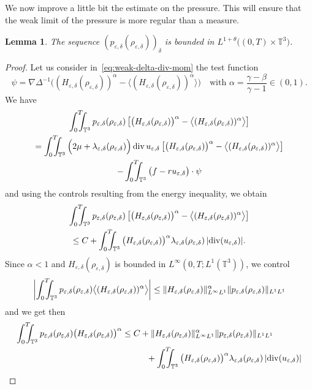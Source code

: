 \documentclass[10pt]{amsart}
\newcommand{\<}{\bigl\langle}
\renewcommand{\>}{\bigr\rangle}
\newcommand{\intTTT}{\int_0^T\hspace*{-2.5mm}\int_{\TT}}
\newtheorem{lem}[thm]{Lemma}
\theoremstyle{definition}
\theoremstyle{remark}
\newcommand{\TT}{\mathbb{T}^3}
\DeclareMathOperator{\Div}{div}
\let\ep\varepsilon
\begin{document}
We now improve a little bit the estimate on the pressure.
This will ensure that the weak limit of the pressure is more regular than a measure.
\begin{lem}{\label{lem:estim-pressure}}
The sequence $(p_{\ep,\delta}(\rho_{\ep,\delta}))_\delta$ is bounded in $L^{1+\theta}\big((0,T)\times \TT \big)$.
\end{lem}
\begin{proof}
Let us consider in~\eqref{eq:weak-delta-div-mom} the test function
\[
\psi = \nabla \Delta^{-1}\big((H_{\ep,\delta}(\rho_{\ep,\delta}))^\alpha - \<(H_{\ep,\delta}(\rho_{\ep,\delta}))^\alpha\> \big) \quad \text{with } \alpha = \dfrac{\gamma - \beta}{\gamma-1} \in (0,1).
\]
We have
\begin{multline*}
\intTTT{p_{\ep,\delta}(\rho_{\ep,\delta}) \left[\big(H_{\ep,\delta}(\rho_{\ep,\delta}) \big)^{\alpha} - \<(H_{\ep,\delta}(\rho_{\ep,\delta}))^\alpha\> \right] } \\
= \intTTT{\Big(2\mu + \lambda_{\ep,\delta}(\rho_{\ep,\delta})\Big)\Div u_{\ep,\delta} \left[\big(H_{\ep,\delta}(\rho_{\ep,\delta}) \big)^{\alpha} - \<(H_{\ep,\delta}(\rho_{\ep,\delta}))^\alpha\> \right]} \\
- \intTTT{\big(f-ru_{\ep,\delta}\big) \cdot \psi }
\end{multline*}
and using the controls resulting from the energy inequality, we obtain
\begin{multline*}
\intTTT{p_{\ep,\delta}(\rho_{\ep,\delta}) \left[\big(H_{\ep,\delta}(\rho_{\ep,\delta}) \big)^{\alpha} - \<(H_{\ep,\delta}(\rho_{\ep,\delta}))^\alpha\> \right] } \\
\leq C + \intTTT{\big(H_{\ep,\delta}(\rho_{\ep,\delta}) \big)^{\alpha}\lambda_{\ep,\delta}(\rho_{\ep,\delta})\,|{\Div(u_{\ep,\delta})}| }.
\end{multline*}
Since $\alpha < 1$ and $H_{\ep,\delta}(\rho_{\ep,\delta})$ is bounded in $L^\infty(0,T;L^1(\TT))$,
we control
\[
\biggl|\intTTT{p_{\ep,\delta}(\rho_{\ep,\delta}) \<(H_{\ep,\delta}(\rho_{\ep,\delta}))^\alpha\> }\biggr|
\leq \|H_{\ep,\delta}(\rho_{\ep,\delta})\|_{L^\infty L^1}^{\alpha} \|p_{\ep,\delta}(\rho_{\ep,\delta})\|_{L^1L^1}
\]
and we get then
\begin{align*}
\intTTT{p_{\ep,\delta}(\rho_{\ep,\delta}) \big(H_{\ep,\delta}(\rho_{\ep,\delta}) \big)^{\alpha}}
& \leq C + \|H_{\ep,\delta}(\rho_{\ep,\delta})\|_{L^\infty L^1}^{\alpha} \|p_{\ep,\delta}(\rho_{\ep,\delta})\|_{L^1L^1} \\
& \hspace*{1cm} + \intTTT{\big(H_{\ep,\delta}(\rho_{\ep,\delta}) \big)^{\alpha}\lambda_{\ep,\delta}(\rho_{\ep,\delta})\,|{\Div(u_{\ep,\delta})}| } \\

\end{align*}
\end{proof}
\end{document}
